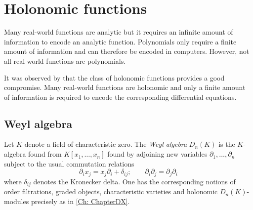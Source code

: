 

\section{Holonomic functions}\label{sec: HolAlgorithm}
Many real-world functions are analytic but it requires an infinite amount of information to encode an analytic function.
Polynomials only require a finite amount of information and can therefore be encoded in computers.
However, not all real-world functions are polynomials.

It was observed by \cite{zeilberger1990holonomic} that the class of holonomic functions provides a good compromise.
Many real-world functions are holonomic and only a finite amount of information is required to encode the corresponding differential equations.
\subsection{Weyl algebra}
Let $K$ denote a field of characteristic zero.
The {\it Weyl algebra} $D_n(K)$ is the $K$-algebra found from $K[x_1,\ldots,x_n]$ found by adjoining new variables $\partial_1,\ldots,\partial_n$ subject to the usual commutation relations
$$\partial_i x_j = x_j \partial_i + \delta_{ij};\qquad \partial_i \partial_j = \partial_j \partial_i $$
where $\delta_{ij}$ denotes the Kronecker delta.
One has the corresponding notions of order filtrations, graded objects, characteristic varieties and holonomic $D_n(K)$-modules precisely as in \cref{Ch: ChapterDX}.

